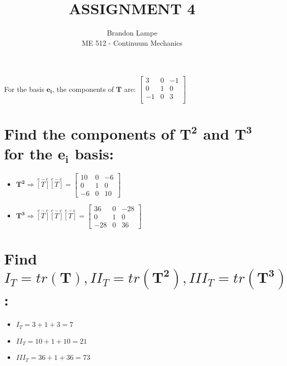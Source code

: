 \documentclass[10pt, letterpaper]{article}
\begin{document}
 
 
\title{ASSIGNMENT 4}%
\author{Brandon Lampe\\ %
ME 512 - Continuum Mechanics} %
 
\maketitle

For the basis $\bm{e_i}$, the components of $\bm{T}$ are:  
		$\begin{bmatrix} 3 & 0 &-1 \\ 0 & 1 & 0 \\ -1 & 0 & 3\\
						 \end{bmatrix} $
\section{Find the components of $\bm{T^2}$ and $\bm{T^3}$ for the $\bm{e_i}$ basis:}
	\begin{itemize}
		\item $\bm{T^2} \Rightarrow \overset{e-e}{[T]} \overset{e-e}{[T]} = \begin{bmatrix}
			10 & 0 & -6 \\
			0 & 1 & 0 \\
			-6 & 0 & 10
			\end{bmatrix}$

		\item $\bm{T^3} \Rightarrow \overset{e-e}{[T]}\overset{e-e}{[T]}\overset{e-e}{[T]}= \begin{bmatrix}
			36 & 0 & -28 \\
			0 & 1 & 0 \\
			-28 & 0 & 36
			\end{bmatrix}$	
	\end{itemize}
\section{Find $I_T = tr(\bm{T}), II_T = tr(\bm{T^2}), III_T = tr(\bm{T^3})$:}
	\begin{itemize}
		\item $I_T = 3+1+3 = 7$
		\item$II_T = 10 + 1 + 10 = 21$
		\item$III_T = 36 + 1 + 36 = 73 $
	\end{itemize} 
	
\end{document}
